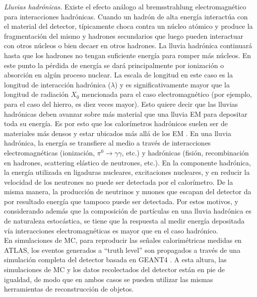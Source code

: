 \indent \emph{Lluvias hadrónicas.} Existe el efecto análogo al bremsstrahlung electromagnético para interacciones  hadrónicas. Cuando un hadrón de alta energía interactúa con el material del detector, típicamente choca contra un núcleo atómico y produce la fragmentación del mismo y hadrones secundarios que luego pueden interactuar con otros núcleos o bien decaer en otros hadrones. La lluvia hadrónica continuará hasta que los hadrones no tengan suficiente energía para romper más núcleos. En este punto la pérdida de energía se dará principalmente por ionización o absorción en algún proceso nuclear\cite{DetectorBook6}. La escala de longitud en este caso es la longitud de interacción hadrónica ($\lambda$) y es significativamente mayor que la longitud de radiación $X_0$ mencionada para el caso electromagnético (por ejemplo, para el caso del hierro, es diez veces mayor). Esto quiere decir que las lluvias hadrónicas deben avanzar sobre más material que una lluvia EM para depositar toda su energía. Es por esto que los calorímetros hadrónicos suelen ser de materiales más densos y estar ubicados más allá de los EM \cite{Instrumentation}. En una lluvia hadrónica, la energía se transfiere al medio a través de interacciones electromagnéticas (ionización, $\pi^0 \rightarrow \gamma\gamma$, etc.) y hadrónicas (fisión, recombinación en hadrones, scattering elástico de neutrones, etc.). En la componente hadrónica, la energía utilizada en ligaduras nucleares, excitaciones nucleares, y en reducir la velocidad de los neutrones no puede ser detectada por el calorímetro. De la misma manera, la producción de neutrinos y muones que escapan del detector da por resultado energía que tampoco puede ser detectada. Por estos motivos, y considerando además que la composición de partículas en una lluvia hadrónica es de naturaleza estocástica, se tiene que la respuesta al medir energía depositada vía interacciones electromagnéticas es mayor que en el caso hadrónico. \\
 
 
En simulaciones de MC, para reproducir las señales calorimétricas medidas en ATLAS, los eventos generados a ``truth level'' son propagados a través de una simulación completa del detector basada en GEANT4 \cite{AtlasSimulation}. A esta altura, las simulaciones de MC y los datos recolectados del detector están en pie de igualdad, de modo que en ambos casos se pueden utilizar las mismas herramientas de reconstrucción de objetos.

